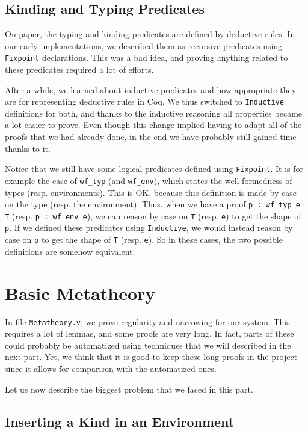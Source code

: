 \documentclass[a4paper,11pt]{article}
\begin{document}
\subsection*{Kinding and Typing Predicates}

On paper, the typing and kinding predicates are defined by deductive
rules. In our early implementations, we described them as recursive
predicates using \verb|Fixpoint| declarations. This was a bad idea,
and proving anything related to these predicates required a lot
of efforts.

After a while, we learned about inductive predicates and how
appropriate they are for representing deductive rules in Coq. We thus
switched to \verb|Inductive| definitions for both, and thanks to the
inductive reasoning all properties became a lot easier to prove. Even
though this change implied having to adapt all of the proofs that we
had already done, in the end we have probably still gained time thanks
to it.

Notice that we still have some logical predicates defined using
\verb|Fixpoint|. It is for example the case of \verb|wf_typ| (and
\verb|wf_env|), which states the well-formedness of types
(resp. environments). This is OK, because this definition is made
by case on the type (resp. the environment). Thus, when we have a
proof \verb|p : wf_typ e T| (resp. \verb|p : wf_env e|),
we can reason by case on \verb|T| (resp. \verb|e|) to get the
shape of \verb|p|. If we defined these predicates using
\verb|Inductive|, we would instead reason by case on \verb|p| to get
the shape of \verb|T| (resp. \verb|e|). So in these cases, the two
possible definitions are somehow equivalent.

\section{Basic Metatheory}

In file \verb|Metatheory.v|, we prove regularity and narrowing for our
system. This requires a lot of lemmas, and some proofs are very
long. In fact, parts of these could probably be automatized using
techniques that we will described in the next part. Yet, we think that
it is good to keep these long proofs in the project since it allows
for comparison with the automatized ones.

Let us now describe the biggest problem that we faced in this part.

\subsection*{Inserting a Kind in an Environment}
\end{document}
